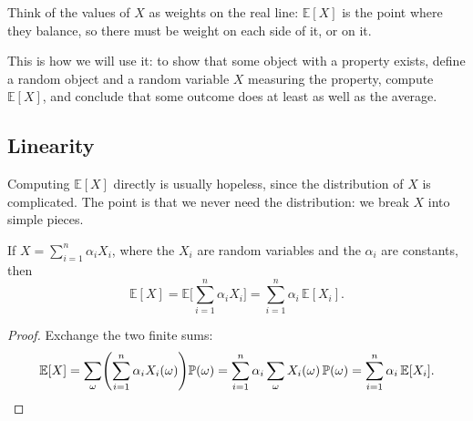 Think of the values of \(X\) as weights on the real line: \(\mathbb{E}[X]\) is the point where they balance, so there must be weight on each side of it, or on it.
\begin{center}
\end{center}

This is how we will use it: to show that some object with a property exists, define a random object and a random variable \(X\) measuring the property, compute \(\mathbb{E}[X]\), and conclude that some outcome does at least as well as the average.

\subsection{Linearity}

Computing \(\mathbb{E}[X]\) directly is usually hopeless, since the distribution of \(X\) is complicated. The point is that we never need the distribution: we break \(X\) into simple pieces.

\begin{theorem}\label{thm:linearity}
    If \(X = \sum_{i=1}^{n} \alpha_i X_i\), where the \(X_i\) are random variables and the \(\alpha_i\) are constants, then
    \[
        \mathbb{E}[X] = \mathbb{E}\Biggl[ \sum_{i=1}^{n} \alpha_i X_i \Biggr] = \sum_{i=1}^{n} \alpha_i \, \mathbb{E}[X_i].
    \]
\end{theorem}

\begin{proof}
    Exchange the two finite sums:
    \[
        \mathbb{E}[X] = \sum_{\omega} \Biggl( \sum_{i=1}^{n} \alpha_i X_i(\omega) \Biggr) \mathbb{P}(\omega)
        = \sum_{i=1}^{n} \alpha_i \sum_{\omega} X_i(\omega) \, \mathbb{P}(\omega)
        = \sum_{i=1}^{n} \alpha_i \, \mathbb{E}[X_i]. \qedhere
    \]
\end{proof}

